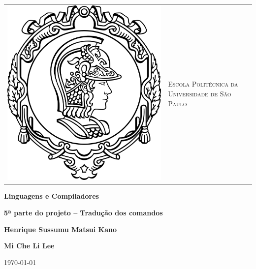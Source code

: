 \begin{titlepage}

\begin{center}

\small

\begin{tabularx}{\linewidth}{ c X }

\parbox[c]{3cm}{
\includegraphics[width=\linewidth]{figuras/minerva}} &
\begin{center}
\textsf{\textsc{Escola Politécnica da Universidade de São Paulo
}} 
\end{center}

\end{tabularx}

\vfill

\vfill

\LARGE

\textbf{Linguagens e Compiladores}

\vfill

\vfill

\large

\textbf{5ª parte do projeto – Tradução dos comandos}

\vfill

\vfill

\textbf{Henrique Sussumu Matsui Kano}

\textbf{Mi Che Li Lee}

\vfill

\vfill

\large

\today

\end{center}

\end{titlepage}
